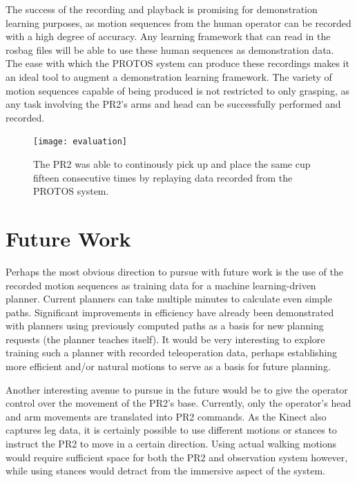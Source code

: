 \documentclass{sig-alternate}
\begin{document}
\indent The success of the recording and playback is promising for demonstration learning purposes, as motion sequences from the
 human operator can be recorded with a high degree of
accuracy. Any learning framework that can read in the rosbag files will be able to use these human sequences as demonstration data. The ease with which the PROTOS system can 
produce these recordings makes it an ideal tool to augment a demonstration learning framework. The variety of motion sequences capable of being produced is not restricted
to only grasping, as any task involving the PR2's arms and head can be successfully performed and recorded.

\begin{figure}[htb] 
	\begin{center}
		\texttt{[image: evaluation]}
	\end{center}
	\caption{The PR2 was able to continously pick up and place the same cup fifteen consecutive times by replaying data recorded from the PROTOS system.}
	\label{fig:evaluation}
\end{figure}

\section{Future Work}
\label{sec:future_work} Perhaps the most obvious direction to pursue with
future work is the use of the recorded motion sequences as training data
for a machine learning-driven planner. Current planners can take multiple 
minutes to 
calculate even simple paths. Significant improvements in efficiency have 
already been demonstrated with planners using previously computed paths as a 
basis for new planning requests (the planner teaches itself). It would be
very interesting to explore training such a planner with recorded teleoperation
data, perhaps establishing more efficient and/or natural motions to serve as
a basis for future planning.

Another interesting avenue to pursue in the future would be to give the 
operator control over the movement of the PR2's base. Currently, only
the operator's head and arm movements are translated into PR2 commands. As the
Kinect also captures leg data, it is certainly possible to use different
motions or stances to instruct the PR2 to move in a certain direction.
Using actual walking motions would require sufficient space for both the PR2
and observation system however, while 
using stances would detract from the immersive aspect of the system.
\end{document}
